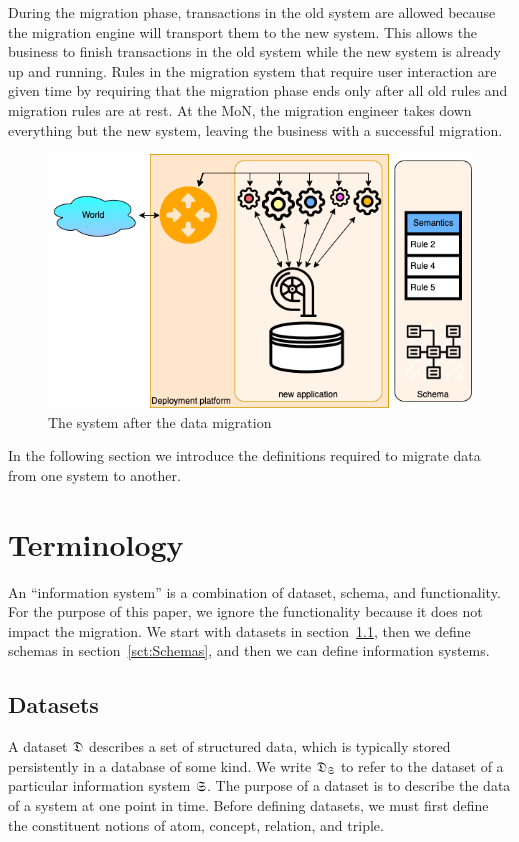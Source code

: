 \documentclass{elsarticle}
\begin{document}
   During the migration phase, transactions in the old system are allowed because the migration engine will transport them to the new system.
   This allows the business to finish transactions in the old system while the new system is already up and running.
   Rules in the migration system that require user interaction are given time by requiring that the migration phase ends
   only after all old rules and migration rules are at rest.
   At the MoN, the migration engineer takes down everything but the new system,
   leaving the business with a successful migration.
\begin{figure}[bht]
   \begin{center}
     \includegraphics[scale=.35]{datamigration-Post-migration.drawio.png}
   \end{center}
\caption{The system after the data migration}
\label{fig:post-migration}
\end{figure}

   In the following section we introduce the definitions required to migrate data from one system to another.

\section{Terminology}
\label{sct:Terminology}
   An ``information system'' is a combination of dataset, schema, and functionality.
   For the purpose of this paper, we ignore the functionality because it does not impact the migration.
   We start with datasets in section~\ref{sct:Datasets}, then we define schemas in section~\ref{sct:Schemas},
   and then we can define information systems.

\subsection{Datasets}
\label{sct:Datasets}
   A dataset $\mathfrak{D}$ describes a set of structured data, which is typically stored persistently in a database of some kind.
   We write $\mathfrak{D}_{\mathfrak{S}}$ to refer to the dataset of a particular information system $\mathfrak{S}$.
   The purpose of a dataset is to describe the data of a system at one point in time. 
   Before defining datasets, we must first define the constituent notions of atom, concept, relation, and triple.
   
\end{document}
